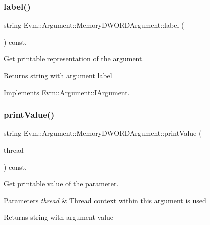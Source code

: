 \subsubsection{\texorpdfstring{label()}{label()}}
{\footnotesize\ttfamily string Evm\+::\+Argument\+::\+Memory\+D\+W\+O\+R\+D\+Argument\+::label (\begin{DoxyParamCaption}{ }\end{DoxyParamCaption}) const\hspace{0.3cm}{\ttfamily [override]}, {\ttfamily [virtual]}}



Get printable representation of the argument. 

\begin{DoxyReturn}{Returns}
string with argument label 
\end{DoxyReturn}


Implements \mbox{\hyperlink{struct_evm_1_1_argument_1_1_i_argument_a35bdae816e89f6f9fc393b6e03c5e521}{Evm\+::\+Argument\+::\+I\+Argument}}.

\mbox{\label{struct_evm_1_1_argument_1_1_memory_d_w_o_r_d_argument_adea7b11736aa7af73ad702e6aaf6e464}} 
\subsubsection{\texorpdfstring{print\+Value()}{printValue()}}
{\footnotesize\ttfamily string Evm\+::\+Argument\+::\+Memory\+D\+W\+O\+R\+D\+Argument\+::print\+Value (\begin{DoxyParamCaption}\item[{\mbox{\hyperlink{struct_evm_1_1_thread_context}{Thread\+Context}} \&}]{thread }\end{DoxyParamCaption}) const\hspace{0.3cm}{\ttfamily [override]}, {\ttfamily [virtual]}}



Get printable value of the parameter. 


\begin{DoxyParams}{Parameters}
{\em thread} & Thread context within this argument is used \\
\hline
\end{DoxyParams}
\begin{DoxyReturn}{Returns}
string with argument value 
\end{DoxyReturn}


